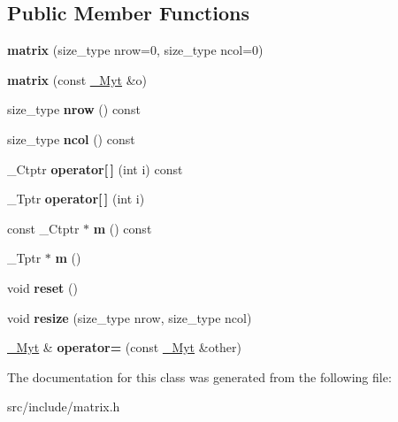 \subsection*{Public Member Functions}
\begin{DoxyCompactItemize}
\item 
\mbox{\label{classupc_1_1matrix_a908e2ae559167d0376d2b095116029ab}} 
{\bfseries matrix} (size\+\_\+type nrow=0, size\+\_\+type ncol=0)
\item 
\mbox{\label{classupc_1_1matrix_aedb3ba241346dfac0655cf4b63715e7f}} 
{\bfseries matrix} (const \hyperlink{classupc_1_1matrix}{\+\_\+\+Myt} \&o)
\item 
\mbox{\label{classupc_1_1matrix_a32aedfcd669ddbff62d5298428691964}} 
size\+\_\+type {\bfseries nrow} () const
\item 
\mbox{\label{classupc_1_1matrix_afda3d3732821b3939741804b1b09a8b2}} 
size\+\_\+type {\bfseries ncol} () const
\item 
\mbox{\label{classupc_1_1matrix_a9d719235e9839d845d0714ef740513c5}} 
\+\_\+\+Ctptr {\bfseries operator\mbox{[}$\,$\mbox{]}} (int i) const
\item 
\mbox{\label{classupc_1_1matrix_a1016950fd091e3798fa475b5f2e90719}} 
\+\_\+\+Tptr {\bfseries operator\mbox{[}$\,$\mbox{]}} (int i)
\item 
\mbox{\label{classupc_1_1matrix_a52e8401037ad88deac59b5cedeffc331}} 
const \+\_\+\+Ctptr $\ast$ {\bfseries m} () const
\item 
\mbox{\label{classupc_1_1matrix_a6b505e71e56088332a4203f6b6032dcf}} 
\+\_\+\+Tptr $\ast$ {\bfseries m} ()
\item 
\mbox{\label{classupc_1_1matrix_aec394dcccbfaad5c75a013874814c475}} 
void {\bfseries reset} ()
\item 
\mbox{\label{classupc_1_1matrix_ad9c957658ec403494af0d92fa2c499fb}} 
void {\bfseries resize} (size\+\_\+type nrow, size\+\_\+type ncol)
\item 
\mbox{\label{classupc_1_1matrix_a9a0d300fcfe6652fde1347c139291919}} 
\hyperlink{classupc_1_1matrix}{\+\_\+\+Myt} \& {\bfseries operator=} (const \hyperlink{classupc_1_1matrix}{\+\_\+\+Myt} \&other)
\end{DoxyCompactItemize}


The documentation for this class was generated from the following file\+:\begin{DoxyCompactItemize}
\item 
src/include/matrix.\+h\end{DoxyCompactItemize}
